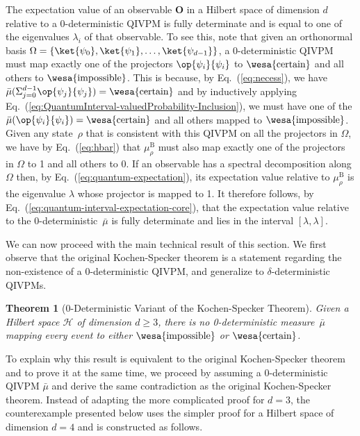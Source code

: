 \documentclass[english,reprint, aps, prl,superscriptaddress, showpacs,
showkeys, longbibliography, amsmath, amssymb, floatfix]{revtex4-1}
\theoremstyle{plain}
\newtheorem{thm}{Theorem}
\theoremstyle{definition}
\newcommand{\Hilb}{\mathcal{H}}
\newcommand{\imposs}{{\text{\wesa{impossible}}}}
\newcommand{\necess}{{\text{\wesa{certain}}}}
\newcommand{\proj}[1]{\op{#1}{#1}}
\begin{document}
The expectation value of an observable $\mathbf{O}$ in a Hilbert space
of dimension $d$ relative to a 0-deterministic QIVPM is fully
determinate and is equal to one of the eigenvalues $\lambda_i$ of that
observable. To see this, note that given an orthonormal basis
$\Omega=\{ \ket{\psi_0},\ket{\psi_1},\ldots,\ket{\psi_{d-1}}\}$, a
0-deterministic QIVPM must map exactly one of the projectors
$\proj{\psi_i}$ to $\necess$ and all others to $\imposs$. This is
because, by Eq.~(\ref{eq:necess}), we have
$\bar{\mu}(\Sigma_{j=0}^{d-1}{\proj{\psi_j}})=\necess$ and by inductively
applying Eq.~(\ref{eq:QuantumInterval-valuedProbability-Inclusion}),
we must have one of the $\bar{\mu}(\proj{\psi_i})=\necess$ and all
others mapped to $\imposs$. Given any state~$\rho$ that is consistent
with this QIVPM on all the projectors in $\Omega$, we have by
Eq.~(\ref{eq:hbar}) that $\mu_{\rho}^{\mathrm{B}}$ must also map
exactly one of the projectors in $\Omega$ to 1 and all others to 0. If
an observable has a spectral decomposition along $\Omega$ then, by
Eq.~(\ref{eq:quantum-expectation}), its expectation value relative to
$\mu_{\rho}^{\mathrm{B}}$ is the eigenvalue $\lambda$ whose projector
is mapped to 1. It therefore follows, by
Eq.~(\ref{eq:quantum-interval-expectation-core}), that the expectation
value relative to the 0-deterministic~${\bar{\mu}}$ is fully
determinate and lies in the interval $[\lambda,\lambda]$.

We can now proceed with the main technical result of this section. We
first observe that the original Kochen-Specker theorem is a statement
regarding the non-existence of a $0$-deterministic QIVPM, and
generalize to $\delta$-deterministic QIVPMs.

\begin{thm}[0-Deterministic Variant of the Kochen-Specker
  Theorem] \label{thm:Kochen-Specker} Given a Hilbert space $\Hilb$ of
  dimension $d\ge3$, there is no 0-deterministic measure~$\bar{\mu}$
  mapping every event to either $\imposs$ or $\necess$.
\end{thm}

\noindent To explain why this result is equivalent to the original
Kochen-Specker theorem and to prove it at the same time, we proceed by
assuming a 0-deterministic QIVPM $\bar{\mu}$ and derive the same
contradiction as the original Kochen-Specker theorem. Instead of
adapting the more complicated proof for $d=3$, the counterexample
presented below uses the simpler proof for a Hilbert space of
dimension $d=4$ and is constructed as follows.
\end{document}
